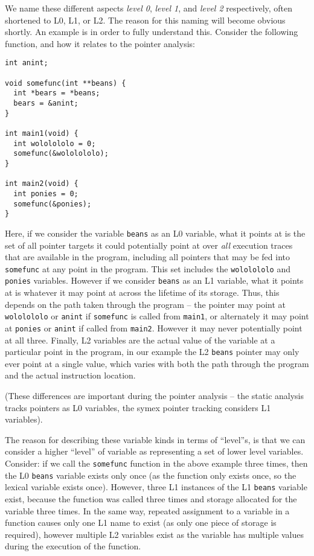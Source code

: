 \documentclass{article}
\begin{document}
We name these different aspects \textit{level 0}, \textit{level 1}, and
\textit{level 2} respectively, often shortened to L0, L1, or L2. The reason
for this naming will become obvious shortly. An example is in order to fully
understand this. Consider the following function, and how it relates to the
pointer analysis:

\lstset{numbers=left}
\begin{lstlisting}
int anint;

void somefunc(int **beans) {
  int *bears = *beans;
  bears = &anint;
}

int main1(void) {
  int wololololo = 0;
  somefunc(&wololololo);
}

int main2(void) {
  int ponies = 0;
  somefunc(&ponies);
}
\end{lstlisting}

Here, if we consider the variable \texttt{beans} as an L0 variable, what it
points at is the set of all pointer targets it could potentially point at over
\textit{all} execution traces that are available in the program, including
all pointers that may be fed into \texttt{somefunc} at any point in the
program. This set includes the \texttt{wololololo} and \texttt{ponies}
variables. However if we consider \texttt{beans} as an L1 variable, what it
points at is whatever it may point at across the lifetime of its storage. Thus,
this depends on the path taken through the program -- the pointer may point
at \texttt{wololololo} or \texttt{anint} if \texttt{somefunc} is called from
\texttt{main1}, or alternately it may point at \texttt{ponies} or \texttt{anint}
if called from \texttt{main2}. However it may never potentially point at all
three. Finally, L2 variables are the actual value of the variable at a
particular point in the program, in our example the L2 \texttt{beans} pointer
may only ever point at a single value, which varies with both the path through
the program and the actual instruction location.

(These differences are important during the pointer analysis -- the static
analysis tracks pointers as L0 variables, the symex pointer tracking considers
L1 variables).

The reason for describing these variable kinds in terms of ``level''s, is
that we can consider a higher ``level'' of variable as representing a set of
lower level variables. Consider: if we call the \texttt{somefunc} function
in the above example three times, then the L0 \texttt{beans} variable exists
only once (as the function only exists once, so the lexical variable exists
once). However, three L1 instances of the L1 \texttt{beans} variable exist,
because the function was called three times and storage allocated for the
variable three times. In the same way, repeated assignment to a variable
in a function causes only one L1 name to exist (as only one piece of storage
is required), however multiple L2 variables exist as the variable has
multiple values during the execution of the function.
\end{document}
